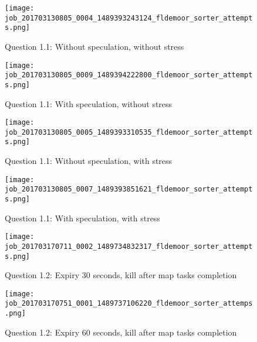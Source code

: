 
\begin{figure}[!ht]
    \centering
    \texttt{[image: job\_201703130805\_0004\_1489393243124\_fldemoor\_sorter\_attempts.png]}
    \caption{Question 1.1: Without speculation, without stress}
    \label{1.1.specOff.noStress}
\end{figure}
\newpage

\begin{figure}[!ht]
    \centering
    \texttt{[image: job\_201703130805\_0009\_1489394222800\_fldemoor\_sorter\_attempts.png]}
    \caption{Question 1.1: With speculation, without stress}
    \label{1.1.specOn.noStress}
\end{figure}

\begin{figure}[!ht]
    \centering
    \texttt{[image: job\_201703130805\_0005\_1489393310535\_fldemoor\_sorter\_attempts.png]}
    \caption{Question 1.1: Without speculation, with stress}
    \label{1.1.specOff.Stress}
\end{figure}
\newpage

\begin{figure}[!ht]
    \centering
    \texttt{[image: job\_201703130805\_0007\_1489393851621\_fldemoor\_sorter\_attempts.png]}
    \caption{Question 1.1: With speculation, with stress}
    \label{1.1.specOn.Stress}
\end{figure}
\newpage


\begin{figure}[!ht]
    \centering
    \texttt{[image: job\_201703170711\_0002\_1489734832317\_fldemoor\_sorter\_attempts.png]}
    \caption{Question 1.2: Expiry 30 seconds, kill after map tasks completion}
    \label{1.2.30s.reduce}
\end{figure}
\newpage

\begin{figure}[!ht]
    \centering
    \texttt{[image: job\_201703170751\_0001\_1489737106220\_fldemoor\_sorter\_attemps.png]}
    \caption{Question 1.2: Expiry 60 seconds, kill after map tasks completion}
    \label{1.2.60s.reduce}
\end{figure}
\newpage

